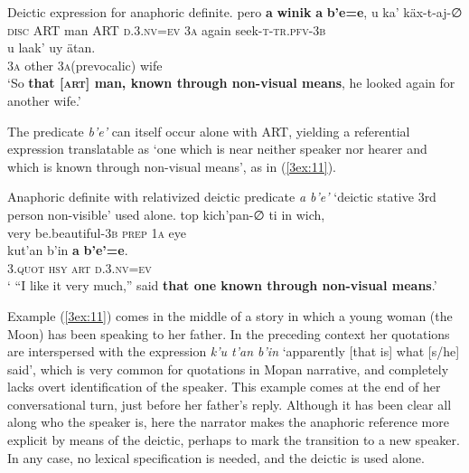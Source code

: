 \documentclass[output=paper]{langsci/langscibook}
\begin{document}
\begin{exe}
\ex\label{3ex:10}
Deictic expression for anaphoric definite. 
\exi{}
\gll	pero 		{\textbf{a}} 	{\textbf{winik}}		{\textbf{a}} 	{\textbf{b'e=e}}, 			u 		ka'		k\"ax-t-aj-∅ \\
	{\textsc{disc}}	ART	man	ART	{\textsc{d.3.nv=ev}}		{\textsc{3a}}	again	seek-{\textsc{t-tr.pfv-3b}} \\
\glt
\exi{}
\gll	u 		laak' 		uy					\"atan. \\
	3{\textsc{a}}	other		3{\textsc{a}}(prevocalic)		wife \\
\glt	`So {\textbf{that [{\textsc{art}}] man, known through non-visual means}}, he looked again for another wife.'
\end{exe}

The predicate {\emph{b'e'}} can itself occur alone with ART, yielding a referential expression translatable as `one which is near neither speaker nor hearer and which is known through non-visual means', as in (\ref{3ex:11}).

\begin{exe}
\ex\label{3ex:11}
Anaphoric definite with relativized deictic predicate {\emph{a b'e'}} `deictic stative 3rd person non-visible' used alone. 
\exi{}
\gll	top 		kich'pan-{∅} 			ti			in 		wich, \\
	very		be.beautiful-3{\textsc{b}}		{\textsc{prep}}		1{\textsc{a}}	eye \\
\glt
\exi{}
\gll	kut'an		b'in	 	{\textbf{a}} 	{\textbf{b'e'=e}}. \\
	3.{\textsc{quot}}	{\textsc{hsy}}	{\textsc{art}}	{\textsc{d}}.3.{\textsc{nv=ev}} \\
\glt	` ``I like it very much,'' said {\textbf{that one known through non-visual means}}.'
\end{exe}

Example (\ref{3ex:11}) comes in the middle of a story in which a young woman (the Moon) has been speaking to her father.  In the preceding context her quotations are interspersed with the expression {\emph{k'u t'an b'in}} `apparently [that is] what [s/he] said', which is very common for quotations in Mopan narrative, and completely lacks overt identification of the speaker.  This example comes at the end of her conversational turn, just before her father's reply.  Although it has been clear all along who the speaker is, here the narrator makes the anaphoric reference more explicit by means of the deictic, perhaps to mark the transition to a new speaker.  In any case, no lexical specification is needed, and the deictic is used alone. 
\end{document}
